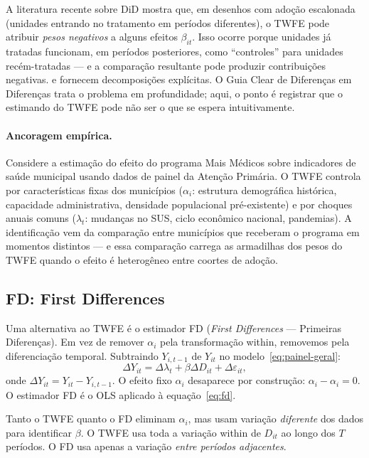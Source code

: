 A literatura recente sobre DiD mostra que, em desenhos com adoção escalonada (unidades entrando no tratamento em períodos diferentes), o TWFE pode atribuir \textit{pesos negativos} a alguns efeitos $\beta_{it}$. Isso ocorre porque unidades já tratadas funcionam, em períodos posteriores, como ``controles'' para unidades recém-tratadas --- e a comparação resultante pode produzir contribuições negativas. \citet{dechaisemartin2020} e \citet{goodmanbacon2021} fornecem decomposições explícitas. O Guia Clear de Diferenças em Diferenças trata o problema em profundidade; aqui, o ponto é registrar que o estimando do TWFE pode não ser o que se espera intuitivamente.

\paragraph{Ancoragem empírica.} Considere a estimação do efeito do programa Mais Médicos sobre indicadores de saúde municipal usando dados de painel da Atenção Primária. O TWFE controla por características fixas dos municípios ($\alpha_i$: estrutura demográfica histórica, capacidade administrativa, densidade populacional pré-existente) e por choques anuais comuns ($\lambda_t$: mudanças no SUS, ciclo econômico nacional, pandemias). A identificação vem da comparação entre municípios que receberam o programa em momentos distintos --- e essa comparação carrega as armadilhas dos pesos do TWFE quando o efeito é heterogêneo entre coortes de adoção.

\subsection{FD: First Differences}
\label{subsubsec:fd}

Uma alternativa ao TWFE é o estimador FD (\textit{First Differences} --- Primeiras Diferenças). Em vez de remover $\alpha_i$ pela transformação within, removemos pela diferenciação temporal. Subtraindo $Y_{i, t-1}$ de $Y_{it}$ no modelo~\eqref{eq:painel-geral}:
\begin{equation}
\Delta Y_{it} = \Delta \lambda_t + \beta \Delta D_{it} + \Delta \varepsilon_{it},
\label{eq:fd}
\end{equation}
onde $\Delta Y_{it} = Y_{it} - Y_{i, t-1}$. O efeito fixo $\alpha_i$ desaparece por construção: $\alpha_i - \alpha_i = 0$. O estimador FD é o OLS aplicado à equação~\eqref{eq:fd}.

Tanto o TWFE quanto o FD eliminam $\alpha_i$, mas usam variação \textit{diferente} dos dados para identificar $\beta$. O TWFE usa toda a variação within de $D_{it}$ ao longo dos $T$ períodos. O FD usa apenas a variação \textit{entre períodos adjacentes}.

